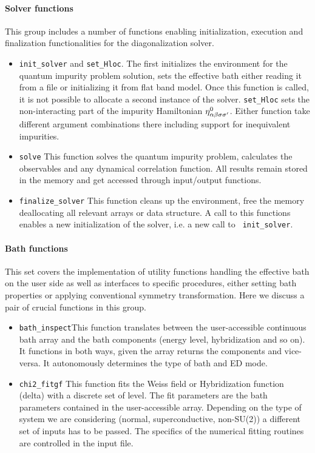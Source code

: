 \documentclass[edipack2.tex]{subfiles}
\begin{document}
\paragraph{{\bf Solver functions}}
This group includes a number of functions enabling initialization,
execution and finalization  functionalities for the diagonalization
solver.
\begin{itemize}
  \item {\tt init\_solver} and {\tt set\_Hloc}. The first 
    initializes the \NAME environment for the quantum impurity problem
    solution, sets the effective bath either reading it from a file or
    initializing it from flat band model. Once this function is
    called, it is not possible to allocate a second instance of the solver.
    {\tt set\_Hloc} sets the
    non-interacting part of the impurity Hamiltonian $\eta^0_{\alpha\beta\sigma\sigma'}$. 
    Either function take different argument combinations there
    including support for inequivalent impurities.

  \item {\tt solve} This function solves the quantum impurity problem,
    calculates the observables and any dynamical correlation
    function. All results remain stored in the memory and get accessed
    through input/output functions.

  \item {\tt finalize\_solver} This function cleans up the \NAME
    environment, free the memory deallocating all relevant arrays or
    data structure. A call to this functions enables a new
    initialization of the solver, i.e. a new call to {\tt
      init\_solver}.  
  \end{itemize}


\paragraph{{\bf Bath functions}}
This set covers the implementation of utility functions handling the
effective bath on the user side as well as interfaces to specific
\NAME procedures, either setting bath properties or applying
conventional symmetry transformation. Here we discuss 
a pair of crucial functions in this group.
\begin{itemize}
\item {\tt bath\_inspect}This function translates between the
  user-accessible continuous bath array and the bath components
  (energy level, hybridization and so on). It functions in both ways,
  given the array returns the components and vice-versa. It
  autonomously determines the type of bath and ED mode.

\item {\tt chi2\_fitgf}
  This function fits the Weiss field or Hybridization function (delta)
  with a discrete set of level. The fit parameters are the bath
  parameters contained in the user-accessible array. Depending on the
  type of system we are considering (normal, superconductive,
  non-SU(2)) a different set of inputs has to be passed. The specifics
  of the numerical fitting routines are controlled in the input file.
  \end{itemize}
\end{document}

